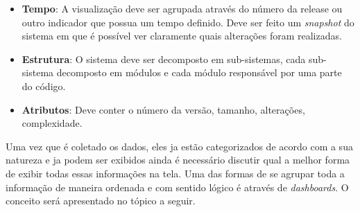 \begin{itemize}
\item \textbf{Tempo}: A visualização deve ser agrupada através do número da release ou outro indicador que possua um tempo definido. Deve ser feito um \textit{snapshot} do sistema em que é possível ver claramente quais alterações foram realizadas.
\item \textbf{Estrutura}: O sistema deve ser decomposto em sub-sistemas, cada sub-sistema decomposto em módulos e cada módulo responsável por uma parte do código.
\item \textbf{Atributos}: Deve conter o número da versão, tamanho, alterações, complexidade.
\end{itemize}

Uma vez que é coletado os dados, eles ja estão categorizados de acordo com a sua natureza e ja podem ser exibidos ainda é necessário discutir qual a melhor forma de exibir todas essas informações na tela. Uma das formas de se agrupar toda a informação de maneira ordenada e com sentido lógico é através de \textit{dashboards}. O conceito será apresentado no tópico a seguir.

